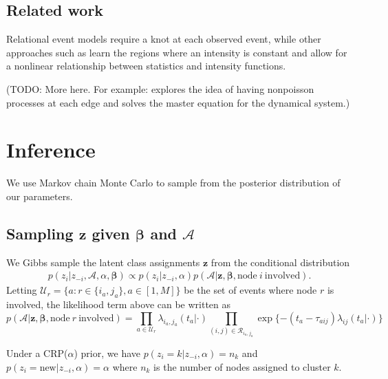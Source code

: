 \documentclass[11pt]{article}
\begin{document}
\subsection{Related work}

Relational event models \cite{Butts2008} require a knot at each observed event, while other approaches such as \cite{Gunawardana2011} learn the regions where an intensity is constant and allow for a nonlinear relationship between statistics and intensity functions.  

(TODO: More here.  For example: \cite{Tillman2011} explores the idea of having nonpoisson processes at each edge and solves the master equation for the dynamical system.)

\section{Inference}

We use Markov chain Monte Carlo to sample from the posterior distribution of our parameters.  

\subsection*{Sampling $\mathbf{z}$ given $\boldsymbol{\beta}$ and $\mathcal{A}$ }

We Gibbs sample the latent class assignments $\mathbf{z}$ from the conditional distribution
\begin{align*}
p(z_i | z_{-i},\mathcal{A},\alpha,\boldsymbol{\beta}) \propto p(z_i | z_{-i},\alpha) p(\mathcal{A}|\mathbf{z},\boldsymbol{\beta},\mbox{node} \ i \ \mbox{involved}).%
\end{align*}
Letting $\mathcal{U}_r = \{a: r \in \{i_a,j_a\}, a \in [1,M]\}$ be the set of events where node $r$ is involved, the likelihood term above can be written as
$$p(\mathcal{A}|\mathbf{z},\boldsymbol{\beta},\mbox{node} \ r \ \mbox{involved}) = \prod_{a \in \mathcal{U}_r} \lambda_{i_a,j_a}(t_a|\cdot)
\prod_{(i,j) \in \mathcal{R}_{i_a,j_a}} \exp \{ -(t_a - \tau_{aij}) \lambda_{ij}(t_a|\cdot)\}$$

\noindent Under a CRP($\alpha$) prior, we have $p(z_i = k | z_{-i},\alpha) = n_k $ and $p(z_i = \mbox{new} |  z_{-i},\alpha) = \alpha$ where $n_k$ is the number of nodes assigned to cluster $k$. 
\end{document}
